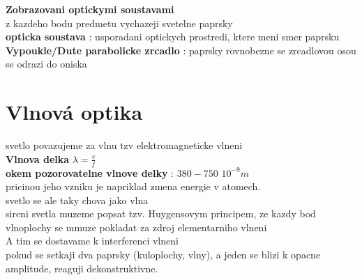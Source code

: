 \documentclass{report}
\begin{document}
\textbf{Zobrazovani optickymi soustavami} \\
z kazdeho bodu predmetu vychazeji svetelne paprsky \\
\textbf{opticka soustava} : usporadani optickych prostredi, ktere meni smer paprsku \\

\textbf{Vypoukle/Dute parabolicke zrcadlo} : paprsky rovnobezne se zrcadlovou osou se odrazi do oniska \\



\newpage



\section{Vlnová optika}

\vspace{0.5cm}
svetlo povazujeme za vlnu tzv elektromagneticke vlneni \\
\textbf{Vlnova delka} $\lambda=\frac{c}{f}$ \\
\textbf{okem pozorovatelne vlnove delky} : $380-750$  $10^{-9}m$ \\
pricinou jeho vzniku je napriklad zmena energie v atomech. \\

svetlo se ale taky chova jako vlna \\
sireni svetla muzeme popsat tzv. Huygensovym principem, ze kazdy bod vlnoplochy se mmuze pokladat za zdroj elementarniho vlneni \\

A tim se dostavame k interferenci vlneni \\
pokud se setkaji dva paprsky (kuloplochy, vlny), a jeden se blizi k opacne amplitude, reaguji dekonstruktivne. \\
\end{document}
